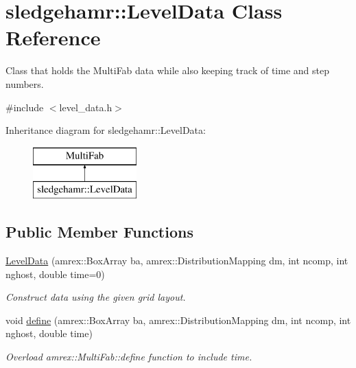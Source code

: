 \hypertarget{classsledgehamr_1_1LevelData}{}\section{sledgehamr\+:\+:Level\+Data Class Reference}
\label{classsledgehamr_1_1LevelData}


Class that holds the Multi\+Fab data while also keeping track of time and step numbers.  




{\ttfamily \#include $<$level\+\_\+data.\+h$>$}

Inheritance diagram for sledgehamr\+:\+:Level\+Data\+:\begin{figure}[H]
\begin{center}
\leavevmode
\includegraphics[height=2.000000cm]{classsledgehamr_1_1LevelData}
\end{center}
\end{figure}
\subsection*{Public Member Functions}
\begin{DoxyCompactItemize}
\item 
\mbox{\hyperlink{classsledgehamr_1_1LevelData_aa3e83b8e4d23e14648c511f80b6bfd39}{Level\+Data}} (amrex\+::\+Box\+Array ba, amrex\+::\+Distribution\+Mapping dm, int ncomp, int nghost, double time=0)
\begin{DoxyCompactList}\small\item\em Construct data using the given grid layout. \end{DoxyCompactList}\item 
void \mbox{\hyperlink{classsledgehamr_1_1LevelData_a5acdbd9ec718975bbf6c8c41f7a73b1a}{define}} (amrex\+::\+Box\+Array ba, amrex\+::\+Distribution\+Mapping dm, int ncomp, int nghost, double time)
\begin{DoxyCompactList}\small\item\em Overload amrex\+::\+Multi\+Fab\+::define function to include time. \end{DoxyCompactList}\end{DoxyCompactItemize}
